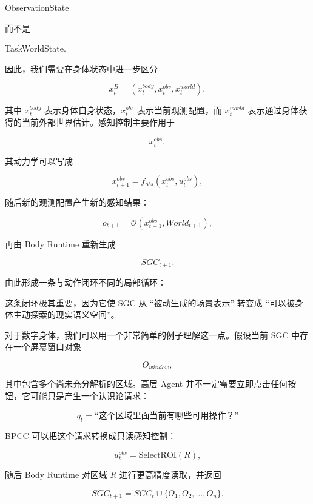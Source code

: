 \begin{statementbox}
ObservationState
\end{statementbox}

而不是

\begin{statementbox}
TaskWorldState.
\end{statementbox}

因此，我们需要在身体状态中进一步区分

\[
x_t^B
=
\left(
x_t^{body},
x_t^{obs},
x_t^{world}
\right),
\]

其中 $x_t^{body}$ 表示身体自身状态，$x_t^{obs}$ 表示当前观测配置，而 $x_t^{world}$ 表示通过身体获得的当前外部世界估计。感知控制主要作用于

\[
x_t^{obs},
\]

其动力学可以写成

\[
x_{t+1}^{obs}
=
f_{obs}
\left(
x_t^{obs},
u_t^{obs}
\right),
\]

随后新的观测配置产生新的感知结果：

\[
o_{t+1}
=
\mathcal O
\left(
x_{t+1}^{obs},
World_{t+1}
\right),
\]

再由 Body Runtime 重新生成

\[
SGC_{t+1}.
\]

由此形成一条与动作闭环不同的局部循环：

\begin{statementbox}
\centering
{}
\end{statementbox}

这条闭环极其重要，因为它使 SGC 从 ``被动生成的场景表示'' 转变成 ``可以被身体主动探索的现实语义空间''。

对于数字身体，我们可以用一个非常简单的例子理解这一点。假设当前 SGC 中存在一个屏幕窗口对象

\[
O_{window},
\]

其中包含多个尚未充分解析的区域。高层 Agent 并不一定需要立即点击任何按钮，它可能只是产生一个认识论请求：

\[
q_t=
\text{``这个区域里面当前有哪些可用操作？''}
\]

BPCC 可以把这个请求转换成只读感知控制：

\[
u_t^{obs}
=
\text{SelectROI}(R),
\]

随后 Body Runtime 对区域 $R$ 进行更高精度读取，并返回

\[
SGC_{t+1}
=
SGC_t
\cup
\{
O_1,O_2,\ldots,O_n
\}.
\]

